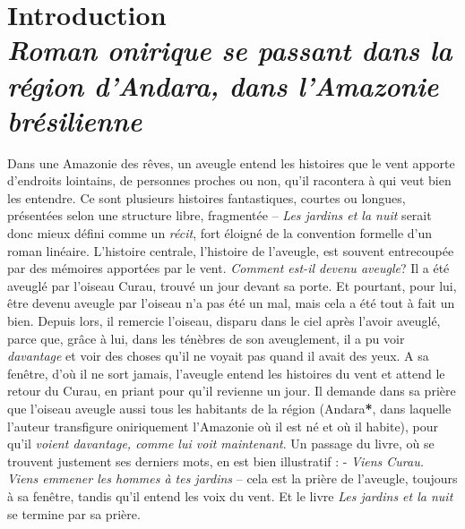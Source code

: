 

\chapter*{Introduction\\
\emph{Roman onirique se passant dans la région d'Andara, dans l'Amazonie brésilienne}}


Dans une Amazonie des rêves, un aveugle entend les histoires que le vent
apporte d'endroits lointains, de personnes proches ou non, qu'il
racontera à qui veut bien les entendre. Ce sont plusieurs histoires
fantastiques, courtes ou longues, présentées selon une structure libre,
fragmentée -- \emph{Les jardins et la nuit} serait donc mieux défini
comme un \emph{récit}, fort éloigné de la convention formelle d'un roman
linéaire. L'histoire centrale, l'histoire de l'aveugle, est souvent
entrecoupée par des mémoires apportées par le vent. \emph{Comment est-il
devenu aveugle}? Il a été aveuglé par l'oiseau Curau, trouvé un jour
devant sa porte. Et pourtant, pour lui, être devenu aveugle par l'oiseau
n'a pas été un mal, mais cela a été tout à fait un bien. Depuis lors, il
remercie l'oiseau, disparu dans le ciel après l'avoir aveuglé, parce
que, grâce à lui, dans les ténèbres de son aveuglement, il a pu voir
\emph{davantage} et voir des choses qu'il ne voyait pas quand il avait
des yeux. A sa fenêtre, d'où il ne sort jamais, l'aveugle entend les
histoires du vent et attend le retour du Curau, en priant pour qu'il
revienne un jour. Il demande dans sa prière que l'oiseau aveugle aussi
tous les habitants de la région (Andara\textbf{*}, dans laquelle l'auteur
transfigure oniriquement l'Amazonie où il est né et où il habite), pour
qu'il \emph{voient davantage, comme lui voit maintenant}. Un passage du
livre, où se trouvent justement ses derniers mots, en est bien
illustratif : - \emph{Viens Curau. Viens emmener les hommes à tes
jardins} -- cela est la prière de l'aveugle, toujours à sa fenêtre,
tandis qu'il entend les voix du vent. Et le livre \emph{Les jardins et
la nuit} se termine par sa prière.\\

